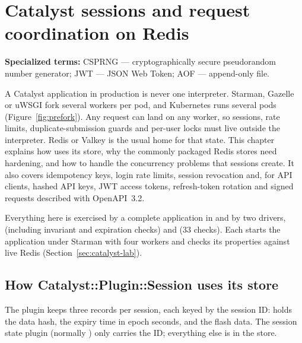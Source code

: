 \chapter{Catalyst sessions and request coordination on Redis}\label{ch:catalyst}
\par\smallskip\noindent\textbf{Specialized terms:} CSPRNG --- cryptographically secure pseudorandom number generator; JWT --- JSON Web Token; AOF --- append-only file.\par\smallskip


A Catalyst application in production is never one interpreter. Starman, Gazelle or uWSGI fork several workers per pod, and Kubernetes runs several pods (Figure~\ref{fig:prefork}). Any request can land on any worker, so sessions, rate limits, duplicate-submission guards and per-user locks must live outside the interpreter. Redis or Valkey is the usual home for that state. This chapter explains how  uses its store, why the commonly packaged Redis stores need hardening, and how to handle the concurrency problems that sessions create. It also covers idempotency keys, login rate limits, session revocation and, for API clients, hashed API keys, JWT access tokens, refresh-token rotation and signed requests described with OpenAPI~3.2.

Everything here is exercised by a complete application in  and by two drivers,  (including invariant and expiration checks) and  (33 checks). Each starts the application under Starman with four workers and checks its properties against live Redis (Section~\ref{sec:catalyst-lab}).

\section{How Catalyst::Plugin::Session uses its store}
The plugin keeps three records per session, each keyed by the session ID:  holds the data hash,  the expiry time in epoch seconds, and  the flash data. The session state plugin (normally ) only carries the ID; everything else is in the store.

